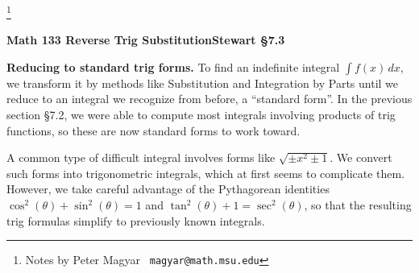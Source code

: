 \documentclass[11pt]{article}
\begin{document}
\footnote[0]{Notes by Peter Magyar \ {\tt magyar@math.msu.edu}}
\vspace{-1em}

\centerline{\bf Math 133\hspace{1.5em} \hfill{\Large\bf
Reverse Trig Substitution}\hfill Stewart \S7.3}
\vspace{1em}

\noindent 
{\bf Reducing to standard trig forms.}
To find an indefinite integral $\int\! f(x)\,dx$, we transform it by methods like Substitution and Integration by Parts until we reduce to an integral we recognize from before, a ``standard form''.
In the previous section \S7.2, we were able to compute most integrals involving products of trig functions,
so these are now standard forms to work toward.


A common type of difficult integral involves forms like $\sqrt{\pm x^2\pm1}$.
We convert such forms into trigonometric integrals, which at first seems to complicate
them. However, we take careful advantage of the Pythagorean identities $\cos^2(\theta)+\sin^2(\theta)=1$ and $\tan^2(\theta)+1=\sec^2(\theta)$,
so that the resulting trig formulas simplify to previously known integrals.
\end{document}
